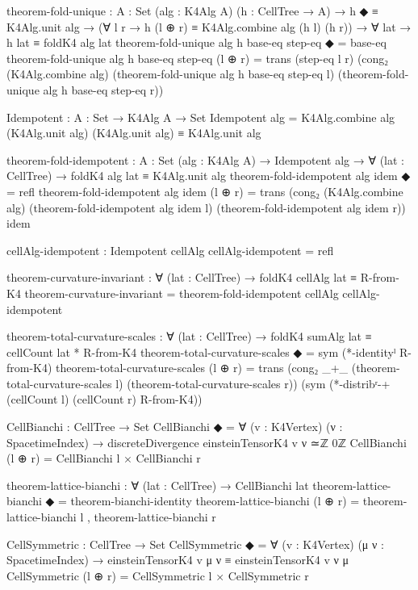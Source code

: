 \documentclass[11pt,a4paper]{book}
\begin{document}
\begin{code}
theorem-fold-unique : {A : Set} (alg : K4Alg A) (h : CellTree → A) →
  h ◆ ≡ K4Alg.unit alg →
  (∀ l r → h (l ⊕ r) ≡ K4Alg.combine alg (h l) (h r)) →
  ∀ lat → h lat ≡ foldK4 alg lat
theorem-fold-unique alg h base-eq step-eq ◆ = base-eq
theorem-fold-unique alg h base-eq step-eq (l ⊕ r) =
  trans (step-eq l r)
        (cong₂ (K4Alg.combine alg)
               (theorem-fold-unique alg h base-eq step-eq l)
               (theorem-fold-unique alg h base-eq step-eq r))

Idempotent : {A : Set} → K4Alg A → Set
Idempotent alg = K4Alg.combine alg (K4Alg.unit alg) (K4Alg.unit alg)
                 ≡ K4Alg.unit alg

theorem-fold-idempotent : {A : Set} (alg : K4Alg A) →
  Idempotent alg →
  ∀ (lat : CellTree) → foldK4 alg lat ≡ K4Alg.unit alg
theorem-fold-idempotent alg idem ◆ = refl
theorem-fold-idempotent alg idem (l ⊕ r) =
  trans (cong₂ (K4Alg.combine alg)
               (theorem-fold-idempotent alg idem l)
               (theorem-fold-idempotent alg idem r))
        idem

cellAlg-idempotent : Idempotent cellAlg
cellAlg-idempotent = refl

theorem-curvature-invariant : ∀ (lat : CellTree) →
  foldK4 cellAlg lat ≡ R-from-K4
theorem-curvature-invariant = theorem-fold-idempotent cellAlg cellAlg-idempotent

theorem-total-curvature-scales : ∀ (lat : CellTree) →
  foldK4 sumAlg lat ≡ cellCount lat * R-from-K4
theorem-total-curvature-scales ◆ = sym (*-identityˡ R-from-K4)
theorem-total-curvature-scales (l ⊕ r) =
  trans (cong₂ _+_
               (theorem-total-curvature-scales l)
               (theorem-total-curvature-scales r))
        (sym (*-distribʳ-+ (cellCount l) (cellCount r) R-from-K4))

CellBianchi : CellTree → Set
CellBianchi ◆       = ∀ (v : K4Vertex) (ν : SpacetimeIndex) →
                       discreteDivergence einsteinTensorK4 v ν ≃ℤ 0ℤ
CellBianchi (l ⊕ r) = CellBianchi l × CellBianchi r

theorem-lattice-bianchi : ∀ (lat : CellTree) → CellBianchi lat
theorem-lattice-bianchi ◆       = theorem-bianchi-identity
theorem-lattice-bianchi (l ⊕ r) =
  theorem-lattice-bianchi l , theorem-lattice-bianchi r

CellSymmetric : CellTree → Set
CellSymmetric ◆       = ∀ (v : K4Vertex) (μ ν : SpacetimeIndex) →
                         einsteinTensorK4 v μ ν ≡ einsteinTensorK4 v ν μ
CellSymmetric (l ⊕ r) = CellSymmetric l × CellSymmetric r


\end{code}
\end{document}
